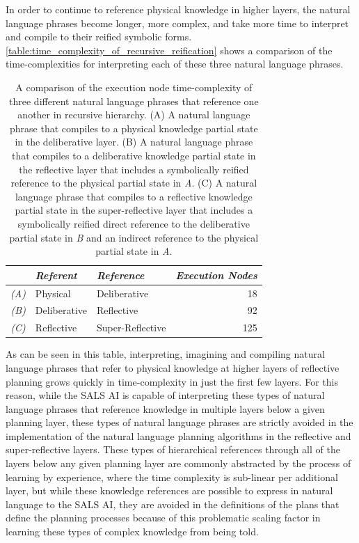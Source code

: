 In order to continue to reference physical knowledge in higher layers,
the natural language phrases become longer, more complex, and take
more time to interpret and compile to their reified symbolic forms.
{\mbox{\autoref{table:time_complexity_of_recursive_reification}}}
shows a comparison of the time-complexities for interpreting each of
these three natural language phrases.
\begin{table}
\centering
\begin{tabular}{|r l|l|r|}
\hline
           &\emph{Referent} &\emph{Reference}  &\emph{Execution Nodes} \\
\hline
\emph{(A)} &Physical        & Deliberative     & 18                    \\
\hline
\emph{(B)} &Deliberative    & Reflective       & 92                    \\
\hline
\emph{(C)} &Reflective      & Super-Reflective & 125                   \\
\hline
\end{tabular}
\caption[A comparison of the execution node time-complexity of three
  different natural language phrases that reference one another in
  recursive hierarchy.]{A comparison of the execution node
  time-complexity of three different natural language phrases that
  reference one another in recursive hierarchy.  (A) A natural
  language phrase that compiles to a physical knowledge partial state
  in the deliberative layer.  (B) A natural language phrase that
  compiles to a deliberative knowledge partial state in the reflective
  layer that includes a symbolically reified reference to the physical
  partial state in \emph{A}.  (C) A natural language phrase that
  compiles to a reflective knowledge partial state in the
  super-reflective layer that includes a symbolically reified direct
  reference to the deliberative partial state in \emph{B} and an
  indirect reference to the physical partial state in \emph{A}.}
\label{table:time_complexity_of_recursive_reification}
\end{table}
As can be seen in this table, interpreting, imagining and compiling
natural language phrases that refer to physical knowledge at higher
layers of reflective planning grows quickly in time-complexity in just
the first few layers.  For this reason, while the SALS AI is capable
of interpreting these types of natural language phrases that reference
knowledge in multiple layers below a given planning layer, these types
of natural language phrases are strictly avoided in the implementation
of the natural language planning algorithms in the reflective and
super-reflective layers.  These types of hierarchical references
through all of the layers below any given planning layer are commonly
abstracted by the process of learning by experience, where the time
complexity is sub-linear per additional layer, but while these
knowledge references are possible to express in natural language to
the SALS AI, they are avoided in the definitions of the plans that
define the planning processes because of this problematic scaling
factor in learning these types of complex knowledge from being told.

